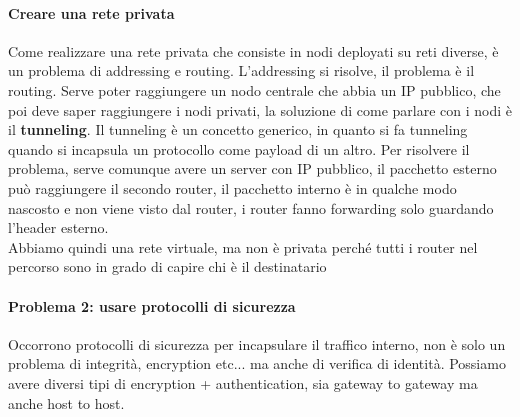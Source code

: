 \documentclass[12pt, oneside]{extbook} %
\begin{document}
\paragraph{Creare una rete privata} Come realizzare una rete privata che consiste in nodi deployati su reti diverse, è un problema di addressing e routing. L'addressing si risolve, il problema è il routing. Serve poter raggiungere un nodo centrale che abbia un IP pubblico, che poi deve saper raggiungere i nodi privati, la soluzione di come parlare con i nodi è il \textbf{tunneling}. Il tunneling è un concetto generico, in quanto si fa tunneling quando si incapsula un protocollo come payload di un altro. 
Per risolvere il problema, serve comunque avere un server con IP pubblico, il pacchetto esterno può raggiungere il secondo router, il pacchetto interno è in qualche modo nascosto e non viene visto dal router, i router fanno forwarding solo guardando l'header esterno.\\Abbiamo quindi una rete virtuale, ma non è privata perché tutti i router nel percorso sono in grado di capire chi è il destinatario
\paragraph{Problema 2: usare protocolli di sicurezza} Occorrono protocolli di sicurezza per incapsulare il traffico interno, non è solo un problema di integrità, encryption etc... ma anche di verifica di identità. Possiamo avere diversi tipi di encryption + authentication, sia gateway to gateway ma anche host to host.
\end{document}
